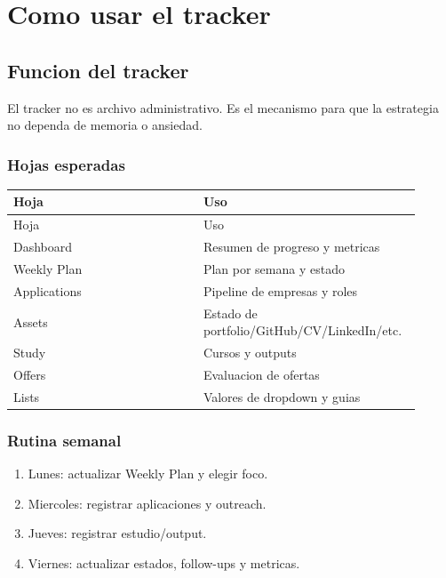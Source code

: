 \chapter{Como usar el tracker}

\section{Funcion del tracker}


El tracker no es archivo administrativo. Es el mecanismo para que la estrategia no dependa de memoria o ansiedad.


\subsection{Hojas esperadas}


\begin{center}
\scriptsize
\begin{longtable}{>{\raggedright\arraybackslash}p{0.455\linewidth} >{\raggedright\arraybackslash}p{0.455\linewidth}}
\toprule
Hoja & Uso \\
\midrule
\endfirsthead
\toprule
Hoja & Uso \\
\midrule
\endhead
Dashboard & Resumen de progreso y metricas \\
Weekly Plan & Plan por semana y estado \\
Applications & Pipeline de empresas y roles \\
Assets & Estado de portfolio/GitHub/CV/LinkedIn/etc. \\
Study & Cursos y outputs \\
Offers & Evaluacion de ofertas \\
Lists & Valores de dropdown y guias \\
\bottomrule
\end{longtable}
\end{center}



\subsection{Rutina semanal}


\begin{enumerate}
\item Lunes: actualizar Weekly Plan y elegir foco.
\item Miercoles: registrar aplicaciones y outreach.
\item Jueves: registrar estudio/output.
\item Viernes: actualizar estados, follow-ups y metricas.
\end{enumerate}


